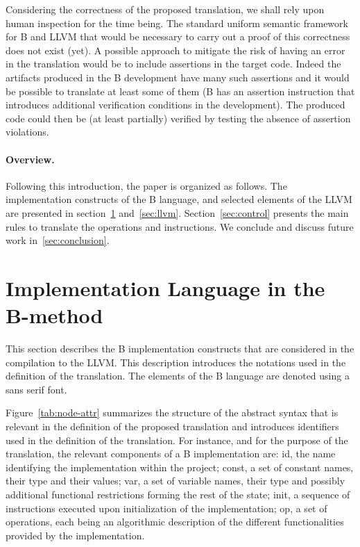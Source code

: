 \documentclass{llncs}
\newcommand{\B}[1]{\textsf{#1}}
\begin{document}
Considering the correctness of the proposed translation, we shall rely upon
human inspection for the time being. The standard uniform semantic framework for
B and LLVM that would be necessary to carry out a proof of this correctness does
not exist (yet). A possible approach to mitigate the risk of having an error in
the translation would be to include assertions in the target code. Indeed the
artifacts produced in the B development have many such assertions and it would
be possible to translate at least some of them (B has an assertion instruction
that introduces additional verification conditions in the development). The
produced code could then be (at least partially) verified by testing the absence
of assertion violations.

\paragraph{Overview.} Following this introduction, the paper is organized as
follows. The implementation constructs of the B language, and selected elements
of the LLVM are presented in section~\ref{sec:b-impl} and~\ref{sec:llvm}.
Section~\ref{sec:control} presents the main rules to translate the operations and
instructions. We conclude and discuss future work in~\ref{sec:conclusion}.

\section{Implementation Language in the B-method}
\label{sec:b-impl}

This section describes the B implementation constructs that are considered in
the compilation to the LLVM. This description introduces the notations used in
the definition of the translation. The elements of the B language are denoted
using a \B{sans serif} font. 

Figure~\ref{tab:node-attr} summarizes the structure
of the abstract syntax that is relevant in the definition of the proposed
translation and introduces identifiers used in the definition of the
translation. For instance, and for the purpose of the translation, the relevant
components of a B implementation are: \B{id}, the name identifying the
implementation within the project; \B{const}, a set of constant
names, their type and their values; \B{var}, a set of variable names, their
type and possibly additional functional restrictions forming the rest of the
state; \B{init}, a sequence of instructions executed upon initialization of
the implementation; \B{op}, a set of operations, each being an algorithmic 
description of the different functionalities provided by the implementation.
\end{document}
